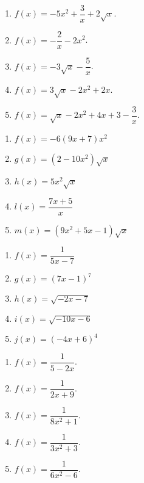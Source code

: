 \documentclass[11pt]{article}
\begin{document}
\begin{multicols}{2}
\begin{exercice}[0]

\begin{enumerate}[itemsep=1em]
\item $f(x)=-5x^{2}+\dfrac{3}{x}+2\sqrt{x}$.\\
\item $f(x)=-\dfrac{2}{x}-2x^{2}$.\\
\item $f(x)=-3\sqrt{x}-\dfrac{5}{x}$.\\
\item $f(x)=3\sqrt{x}-2x^{2}+2x$.\\
\item $f(x)=\sqrt{x}-2x^{2}+4x+3-\dfrac{3}{x}$.\\
\end{enumerate}
\end{exercice}

\begin{exercice}[0]
\begin{enumerate}[itemsep=1em]
\item $f(x)=-6(9x+7)x^2$
\item $g(x)=(2-10x^2)\sqrt{x}$
\item $h(x)=5x^2\sqrt{x}$
\item $l(x)=\dfrac{7x+5}{x}$
\item $m(x)=(9x^2+5x-1)\sqrt{x}$
\end{enumerate}
\end{exercice}

\begin{exercice}[0]
\begin{enumerate}[itemsep=1em]
\item $f(x)=\dfrac{1}{5x-7}$
\item $g(x)=(7x-1)^7$
\item $h(x)=\sqrt{-2x-7}$
\item $i(x)=\sqrt{-10x-6}$
\item $j(x)=(-4x+6)^4$
\end{enumerate}
\end{exercice}

\begin{exercice}[0]
\begin{enumerate}[itemsep=1em]
\item $f(x)=\dfrac{1}{5-2x}$.
\item $f(x)=\dfrac{1}{2x+9}$.
\item $f(x)=\dfrac{1}{8x^2+1}$.
\item $f(x)=\dfrac{1}{3x^2+3}$.
\item $f(x)=\dfrac{1}{6x^2-6}$.
\end{enumerate}
\end{exercice}


\end{multicols}
\end{document}
